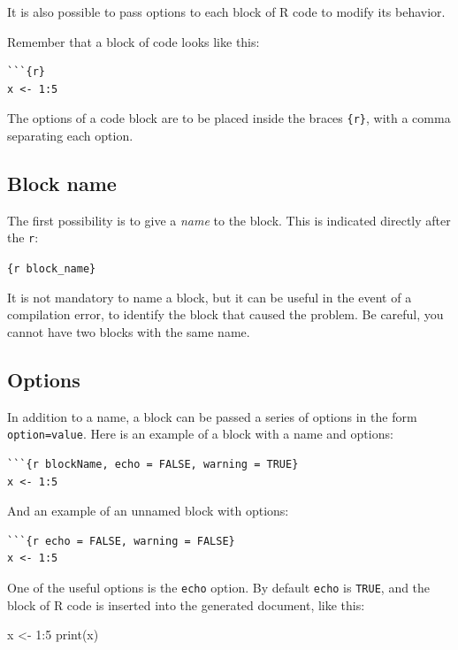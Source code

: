 \documentclass[
  letterpaper,
  DIV=11,
  numbers=noendperiod]{scrreprt}
\newenvironment{Shaded}{\begin{snugshade}}{\end{snugshade}}
\newcommand{\DecValTok}[1]{\textcolor[rgb]{0.68,0.00,0.00}{#1}}
\newcommand{\FunctionTok}[1]{\textcolor[rgb]{0.28,0.35,0.67}{#1}}
\newcommand{\NormalTok}[1]{\textcolor[rgb]{0.00,0.23,0.31}{#1}}
\newcommand{\OtherTok}[1]{\textcolor[rgb]{0.00,0.23,0.31}{#1}}
\newcommand{\SpecialCharTok}[1]{\textcolor[rgb]{0.37,0.37,0.37}{#1}}
\begin{document}
It is also possible to pass options to each block of R code to modify
its behavior.

Remember that a block of code looks like this:

\begin{verbatim}
```{r}
x <- 1:5
\end{verbatim}

The options of a code block are to be placed inside the braces
\texttt{\{r\}}, with a comma separating each option.

\hypertarget{block-name}{%
\subsection{Block name}\label{block-name}}

The first possibility is to give a \emph{name} to the block. This is
indicated directly after the \texttt{r}:

\texttt{\{r\ block\_name\}}

It is not mandatory to name a block, but it can be useful in the event
of a compilation error, to identify the block that caused the problem.
Be careful, you cannot have two blocks with the same name.

\hypertarget{options}{%
\subsection{Options}\label{options}}

In addition to a name, a block can be passed a series of options in the
form \texttt{option=value}. Here is an example of a block with a name
and options:

\begin{verbatim}
```{r blockName, echo = FALSE, warning = TRUE}
x <- 1:5
\end{verbatim}

And an example of an unnamed block with options:

\begin{verbatim}
```{r echo = FALSE, warning = FALSE}
x <- 1:5
\end{verbatim}

One of the useful options is the \texttt{echo} option. By default
\texttt{echo} is \texttt{TRUE}, and the block of R code is inserted into
the generated document, like this:

\begin{Shaded}
\begin{Highlighting}[]
\NormalTok{x }\OtherTok{\textless{}{-}} \DecValTok{1}\SpecialCharTok{:}\DecValTok{5}
\FunctionTok{print}\NormalTok{(x)}
\end{Highlighting}
\end{Shaded}
\end{document}
